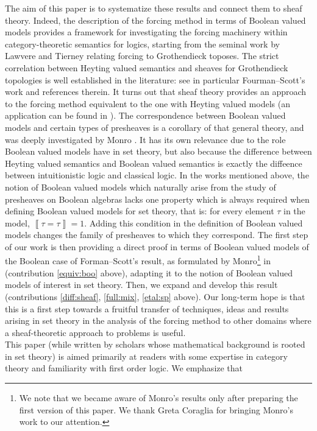 \documentclass[11pt]{amsart}
\theoremstyle{plain}
\theoremstyle{definition}
\theoremstyle{plain}
\theoremstyle{remark}
\newcommand{\Qp}[1]{\left\llbracket #1 \right\rrbracket}
\newcommand{\0}{\mathsf{0}}
\renewcommand{\1}{\mathsf{1}}
\renewcommand{\2}{\mathsf{2}}
\theoremstyle{definition}
\begin{document}
The aim of this paper is to systematize these results and connect them to sheaf theory. Indeed, the description of the forcing method in terms of Boolean valued models provides a framework for investigating the forcing machinery within category-theoretic semantics for logics, starting from the seminal work \cite{LAWTIE} by Lawvere and Tierney relating forcing to Grothendieck toposes. The strict correlation between Heyting valued semantics and sheaves for Grothendieck topologies is well established in the literature: see in particular Fourman--Scott's work \cite{FOURSCOTT} and references therein. It turns out that sheaf theory provides an approach to the forcing method equivalent to the one with Heyting valued models (an application can be found in \cite{Four}). The correspondence between Boolean valued models and certain types of presheaves is a corollary of that general theory, and was deeply investigated by Monro \cite{MONROBIS, MONRO86}. It has its own relevance due to the role Boolean valued models have in set theory, but also because the difference between Heyting valued semantics and Boolean valued semantics is exactly the diffeence between intuitionistic logic and classical logic. In the works mentioned above, the notion of Boolean valued models which naturally arise from the study of presheaves on Boolean algebras lacks one property which is always required when defining Boolean valued models for set theory, that is: for every element $\tau$ in the model, $\Qp{\tau=\tau}=1$. Adding this condition in the definition of Boolean valued models changes the family of presheaves to which they correspond. The first step of our work is then providing a direct proof in terms of Boolean valued models of the Boolean case of Forman--Scott's result, as formulated by Monro\footnote{We note that we became aware of Monro's results only after preparing the first version of this paper. We thank Greta Coraglia for bringing Monro's work to our attention.} in \cite[Proposition 2.3]{MONROBIS} (contribution \ref{equiv:boo} above), adapting it to the notion of Boolean valued models of interest in set theory. Then, we expand and develop this result (contributions \ref{diff:sheaf}, \ref{full:mix}, \ref{etal:sp}  above). Our long-term hope is that this is a first step towards a fruitful transfer of techniques, ideas and results arising in set theory in the analysis of the forcing method to other domains where a sheaf-theoretic approach to problems is useful.\\
This paper (while written by scholars whose mathematical background is rooted in set theory) is aimed primarily at readers with some expertise in category theory and familiarity with first order logic. We emphasize that
\end{document}
